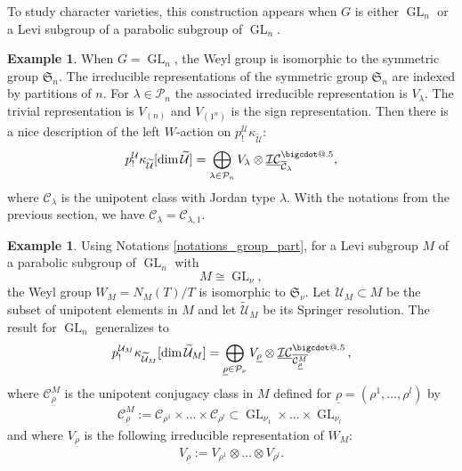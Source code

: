 \documentclass[11pt]{article}
\makeatletter
\newcommand*\bigcdot{\mathpalette\bigcdot@{.5}}
\newcommand*\bigcdot@[2]{\mathbin{\vcenter{\hbox{\scalebox{#2}{$\m@th#1\bullet$}}}}}
\theoremstyle{definition}
\newtheorem{example}[definition]{Example}
\theoremstyle{plain}
\DeclareMathOperator{\GL}{GL}
\newcommand{\sn}{\mathfrak{S}_n}
\newcommand{\Sym}{\mathfrak{S}}
\newcommand{\Part}{\mathcal{P}}
\makeatother
\begin{document}
To study character varieties, this construction appears when $G$ is either $\GL_n$ or a Levi subgroup of a parabolic subgroup of $\GL_n$.
\begin{example}
When $G=\GL_n$, the Weyl group is isomorphic to the symmetric group $\sn$. The irreducible representations of the symmetric group $\sn$ are indexed by partitions of $n$. For $\lambda\in\Part_n$ the associated irreducible representation is $V_\lambda$. The trivial representation is $V_{(n)}$ and $V_{(1^n)}$ is the sign representation. Then there is a nice description of the left $W$-action on $p^{\mathcal{U}}_!\kappa_{\widetilde{\mathcal{U}}}$:
\[
p^{\mathcal{U}}_! \kappa_{\widetilde{\mathcal{U}}}[\dim\widetilde{\mathcal{U}}] =\bigoplus_{\lambda\in \Part_n} V_{\lambda}\otimes\underline{\mathcal{I C}}^{\bigcdot}_{\overline{\mathcal{C}}_{\lambda}},
\]
where $\mathcal{C}_{\lambda}$ is the unipotent class with Jordan type $\lambda$. With the notations from the previous section, we have $\mathcal{C}_{\lambda}=\mathcal{C}_{\lambda,1}$.
\end{example}

\begin{example}
Using Notations \ref{notations_group_part}, for a Levi subgroup $M$ of a parabolic subgroup of $\GL_n$ with
\[
M\cong \GL_{\nu},
\]
the Weyl group $W_M = N_M (T)/T$ is isomorphic to $\Sym_{\nu}$. Let $\mathcal{U}_M\subset M$ be the subset of unipotent elements in $M$ and let $\widetilde{\mathcal{U}}_M$ be its Springer resolution. The result for $\GL_n$ generalizes to
\begin{equation}\label{eq_Springer_NL}
p_!^{\mathcal{U}_M} \kappa_{\widetilde{\mathcal{U}}_M}[\dim \widetilde{\mathcal{U}}_M]=\bigoplus_{\underline{\rho}\in \Part_{\nu}} V_{\underline{\rho}}\otimes \underline{\mathcal{I C}}^{\bigcdot}_{\overline{\mathcal{C}^M_{\underline{\rho}}}}\,,
\end{equation}
where $\mathcal{C}^M_{\underline{\rho}}$ is the unipotent conjugacy class in $M$ defined for $\underline{\rho}=\left(\rho^{1},\dots,\rho^{l}\right)$ by
\[
\mathcal{C}^M_{\underline{\rho}}:=\mathcal{C}_{\rho^{1}}\times\dots\times\mathcal{C}_{\rho^{l}}\subset \GL_{\nu_1}\times\dots\times\GL_{\nu_l}
\]
and where $V_{\underline{\rho}}$ is the following irreducible representation of $W_M$:
\[
V_{\underline{\rho}}:=V_{\rho^1}\otimes\dots\otimes V_{\rho^l}.
\]
\end{example}
\end{document}
